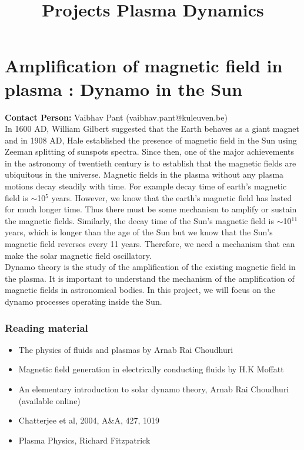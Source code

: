 \documentclass[11pt]{article}
\begin{document}
\pagestyle{myheader}
\title{Projects Plasma Dynamics}
\section{Amplification of magnetic field in plasma : Dynamo in the Sun}
 {\bf Contact Person: } Vaibhav Pant (vaibhav.pant@kuleuven.be)\\
 
 
 In 1600 AD, William Gilbert suggested that the Earth behaves as a giant magnet and in 1908 AD, Hale established the presence of magnetic field in the Sun using Zeeman splitting of sunspots spectra. Since then, one of the major achievements in the astronomy of twentieth century is to establish that the magnetic fields are ubiquitous in the universe. Magnetic fields in the plasma without any plasma motions decay steadily with time. For example decay time of earth's magnetic field is $\sim$10$^{5}$ years. However, we know that the earth's magnetic field has lasted for much longer time. Thus there must be some mechanism to amplify or sustain the magnetic fields. Similarly, the decay time of the Sun's magnetic field is $\sim$10$^{11}$ years, which is longer than the age of the Sun but we know that the Sun's magnetic field reverses every 11 years. Therefore, we need a mechanism that can make the solar magnetic field oscillatory.\\
 Dynamo theory is the study of the amplification of the existing magnetic field in the plasma. It is important to understand the mechanism of the amplification of magnetic fields in astronomical bodies. In this project, we will focus on the dynamo processes operating inside the Sun.
\subsubsection{Reading material}
\begin{itemize}
\item The physics of fluids and plasmas by Arnab Rai Choudhuri
\item Magnetic field generation in electrically conducting fluids by H.K Moffatt
\item An elementary introduction to solar dynamo theory, Arnab Rai Choudhuri (available online)
\item Chatterjee et al, 2004, A\&A, 427, 1019
\item Plasma Physics, Richard Fitzpatrick
\end{itemize}
\end{document}
